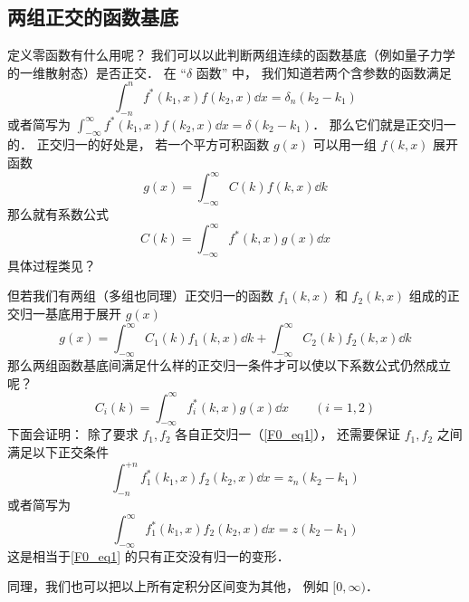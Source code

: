 \subsection{两组正交的函数基底}
定义零函数有什么用呢？ 我们可以以此判断两组连续的函数基底（例如量子力学的一维散射态）是否正交． 在 “$\delta$ 函数” 中， 我们知道若两个含参数的函数满足
\begin{equation}\label{F0_eq1}
\int_{-n}^{n} f^*(k_1, x) f(k_2, x)\dd{x} = \delta_n(k_2 - k_1)
\end{equation}
或者简写为 $\int_{-\infty}^{\infty} f^*(k_1, x) f(k_2, x)\dd{x} = \delta(k_2 - k_1)$． 那么它们就是正交归一的． 正交归一的好处是， 若一个平方可积函数 $g(x)$ 可以用一组 $f(k, x)$ 展开函数
\begin{equation}
g(x) = \int_{-\infty}^{\infty} C(k) f(k, x) \dd{k}
\end{equation}
那么就有系数公式
\begin{equation}
C(k) = \int_{-\infty}^{\infty} f^*(k, x)g(x)\dd{x}
\end{equation}
具体过程类见？

但若我们有两组（多组也同理）正交归一的函数 $f_1(k, x)$ 和 $f_2(k, x)$ 组成的正交归一基底用于展开 $g(x)$
\begin{equation}\label{F0_eq3}
g(x) = \int_{-\infty}^{\infty} C_1(k) f_1(k, x) \dd{k} + \int_{-\infty}^{\infty} C_2(k) f_2(k, x) \dd{k}
\end{equation}
那么两组函数基底间满足什么样的正交归一条件才可以使以下系数公式仍然成立呢？
\begin{equation}\label{F0_eq4}
C_i(k) = \int_{-\infty}^{\infty} f_i^*(k, x)g(x)\dd{x} \qquad (i = 1,2)
\end{equation}
下面会证明： 除了要求 $f_1, f_2$ 各自正交归一（\autoref{F0_eq1}）， 还需要保证 $f_1, f_2$ 之间满足以下正交条件
\begin{equation}
\int_{-n}^{+n} f_1^*(k_1, x) f_2(k_2, x) \dd{x} = z_n(k_2 - k_1)
\end{equation}
或者简写为
\begin{equation}
\int_{-\infty}^{\infty} f_1^*(k_1, x) f_2(k_2, x) \dd{x} = z(k_2 - k_1)
\end{equation}
这是相当于\autoref{F0_eq1} 的只有正交没有归一的变形．

同理，我们也可以把以上所有定积分区间变为其他， 例如 $[0, \infty)$．

